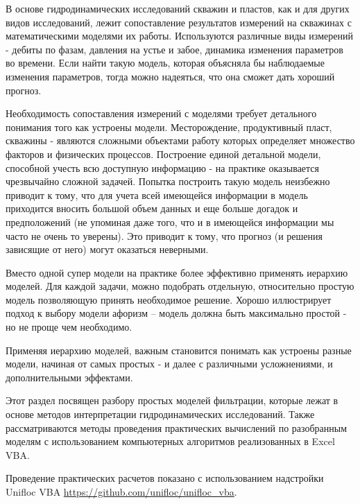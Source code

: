 


В основе гидродинамических исследований скважин и пластов, как и для других видов исследований, лежит сопоставление результатов измерений на скважинах с математическими моделями их работы. Используются различные виды измерений - дебиты по фазам, давления на устье и забое, динамика изменения параметров во времени. Если найти такую модель, которая объясняла бы наблюдаемые изменения параметров, тогда можно надеяться, что она сможет дать хороший прогноз.

Необходимость сопоставления измерений с моделями требует детального понимания того как устроены модели. Месторождение, продуктивный пласт, скважины - являются сложными объектами работу которых определяет множество факторов и физических процессов. Построение единой детальной модели, способной учесть всю доступную информацию - на практике оказывается чрезвычайно сложной задачей. Попытка построить такую модель неизбежно приводит к тому, что для учета всей имеющейся информации в модель приходится вносить большой объем данных и еще больше догадок и предположений (не упоминая даже того, что и в имеющейся информации мы часто не очень то уверены). Это приводит к тому, что прогноз (и решения зависящие от него) могут оказаться неверными. 

Вместо одной супер модели на практике более эффективно применять иерархию моделей. Для каждой задачи, можно подобрать отдельную, относительно простую модель позволяющую принять необходимое решение. Хорошо иллюстрирует подход к выбору модели афоризм -- модель должна быть максимально простой - но не проще чем необходимо. 

Применяя иерархию моделей, важным становится понимать как устроены разные модели, начиная от самых простых - и далее с различными усложнениями, и дополнительными эффектами.

Этот раздел посвящен разбору простых моделей фильтрации, которые лежат в основе методов интерпретации гидродинамических исследований. Также рассматриваются методы проведения практических вычислений по разобранным моделям с использованием компьютерных алгоритмов реализованных в Excel VBA.

Проведение практических расчетов показано с использованием надстройки Unifloc VBA \url{https://github.com/unifloc/unifloc_vba}.

